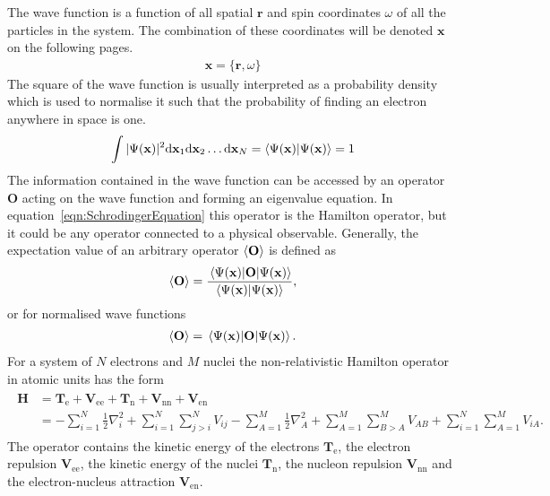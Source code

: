 The wave function is a function of all spatial $\mathbf{r}$ and spin
coordinates $\omega$ of all the particles in the system. The combination of
these coordinates will be denoted $\mathbf{x}$ on the following pages.  
%
\begin{align}
	\mathbf{x}=\{\mathbf{r},\omega\}
\end{align}
%
The square of the wave function is usually interpreted as a probability density
which is used to normalise it such that the probability of finding an electron
anywhere in space is one.
%
\begin{align}
	\int |\Psi(\mathbf{x})|^2\dd \mathbf{x}_1\dd \mathbf{x}_2\ldots\dd \mathbf{x}_N=\braket{\Psi(\mathbf{x})}=1
\end{align}
%
The information contained in the wave function can be accessed by an operator
$\mathbf{O}$ acting on the wave function and forming an eigenvalue equation. In
equation~\eqref{eqn:SchrodingerEquation} this operator is the Hamilton
operator, but it could be any operator connected to a physical observable.
Generally, the expectation value of an arbitrary operator $\expval{\mathbf{O}}$ is
defined as
%
\begin{equation}
    \expval{\mathbf{O}}=\frac{\expval{\mathbf{O}}{\Psi(\mathbf{x})}}{\braket{\Psi(\mathbf{x})}},
\end{equation}
%
or for normalised wave functions
%
\begin{align}
    \expval{\mathbf{O}}=\expval{\mathbf{O}}{\Psi(\mathbf{x})}.
\end{align}
%
For a system of $N$ electrons and $M$ nuclei the non-relativistic Hamilton
operator in atomic units has the form
%
\begin{align}
\begin{aligned}
    \mathbf{H}&=\mathbf{T}_\text{e} + \mathbf{V}_\text{ee} + \mathbf{T}_\text{n} + \mathbf{V}_\text{nn} + \mathbf{V}_\text{en} \\
    &=-\sum_{i=1}^N\frac{1}{2}\nabla_i^2
    + \sum_{i=1}^N\sum_{j>i}^NV_{ij}
    - \sum_{A=1}^M\frac{1}{2}\nabla_A^2
    + \sum_{A=1}^M\sum_{B>A}^MV_{AB}
    + \sum_{i=1}^N\sum_{A=1}^MV_{iA}.\label{eqn:hamiltonoperator}
\end{aligned}
\end{align}
%
The operator contains the kinetic energy of the electrons
$\mathbf{T}_\text{e}$, the electron repulsion $\mathbf{V}_\text{ee}$, the
kinetic energy of the nuclei $\mathbf{T}_\text{n}$, the nucleon repulsion
$\mathbf{V}_\text{nn}$ and the electron-nucleus attraction
$\mathbf{V}_\text{en}$.

